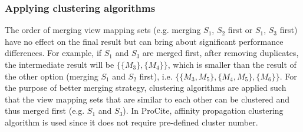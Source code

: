 \begin{example}
\subsubsection{Applying clustering algorithms}
The order of merging view mapping sets (e.g. merging $S_1$, $S_2$ first or $S_1$, $S_3$ first) have no effect on the final result but can bring about significant performance differences. For example, if $S_1$ and $S_3$ are merged first, after removing duplicates, the intermediate result will be $\{\{M_3\}, \{M_4\}\}$, which is smaller than the result of the other option (merging $S_1$ and $S_2$ first), i.e. $\{\{M_3, M_5\}, \{M_4, M_5\}, \{M_6\}\}$. For the purpose of better merging strategy, clustering algorithms are applied such that the view mapping sets that are similar to each other can be clustered and thus merged first (e.g. $S_1$ and $S_3$). In ProCite, affinity propagation clustering algorithm \cite{dueck2007non} is used since it does not require pre-defined cluster number.







\end{example}